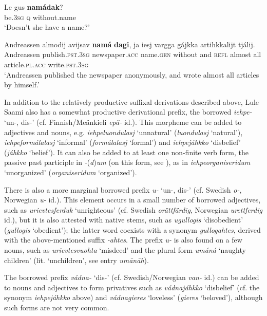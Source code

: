 \documentclass[output=paper,colorlinks,citecolor=brown]{langscibook}
\begin{document}
\ea\label{ex:lul:40} 
    \gll Le gus \textbf{namádak}? \\ 
         be.\textsc{3sg} \textsc{q} without.name \\
    \glt ‘Doesn’t she have a name?’   \citep{SIKOR2021}
\z 

\largerpage
\ea\label{ex:lul:41} 
    \gll Andreassen almodij avijsav \textbf{namá} \textbf{dagi}, ja iesj vargga gájkka artihkkalijt tjálij. \\ 
         Andreassen publish.\textsc{pst.3sg} newspaper.\textsc{acc} name.\textsc{gen} without and \textsc{refl} almost all article.\textsc{pl.acc} write.\textsc{pst.3sg} \\
    \glt ‘Andreassen published the newspaper anonymously, and wrote almost all articles by himself.’  \citep{SIKOR2021}
\z 

In addition to the relatively productive suffixal derivations described above, Lule Saami also has a somewhat productive derivational prefix, the borrowed \textit{iehpe{}-} ‘un{}-, dis-’ (cf. Finnish/Meänkieli \textit{epä{}-} id.). This morpheme can be added to adjectives and nouns, e.g. \textit{iehpeluondulasj} ‘unnatural’ (\leftarrow\space \textit{luondulasj} ‘natural’), \textit{iehpeformálalasj} ‘informal’ (\leftarrow\space \textit{formálalasj} ‘formal’) and \textit{iehpejáhkko} ‘disbelief’ (\leftarrow\space \textit{jáhkko} ‘belief’). It can also be added to at least one non-finite verb form, the passive past participle in \textit{{}-}(\textit{d})\textit{um} (on this form, see \citealt{KejonenFC}), as in \textit{iehpeorganiseridum} ‘unorganized’ (\leftarrow\space \textit{organiseridum} ‘organized’).

There is also a more marginal borrowed prefix \textit{u-} ‘un-, dis-’ (cf. Swedish \textit{o{}-}, Norwegian \textit{u-} id.). This element occurs in a small number of borrowed adjectives, such as \textit{urievtesferduk} ‘unrighteous’ (cf. Swedish \textit{orättfärdig}, Norwegian \textit{urettferdig} id.), but it is also attested with native stems, such as \textit{ugullogis} ‘disobedient’ (\leftarrow\space \textit{gullogis} ‘obedient’); the latter word coexists with a synonym \textit{gullogahtes}, derived with the above-mentioned suffix \textit{{}-ahtes}. The prefix \textit{u{}-} is also found on a few nouns, such as \textit{urievtesvuohta} ‘misdeed’ and the plural form \textit{umáná} ‘naughty children’ (lit. ‘unchildren’, \citealt{Grundström1946} see entry \textit{umānāh}).

The borrowed prefix \textit{vádna-} ‘dis-’ (cf. Swedish/Norwegian \textit{van-} id.) can be added to nouns and adjectives to form privatives such as \textit{vádnajáhkko} ‘disbelief’ (cf. the synonym \textit{iehpejáhkko} above) and \textit{vádnagieres} ‘loveless’ (\leftarrow\space \textit{gieres} ‘beloved’), although such forms are not very common.
\end{document}

